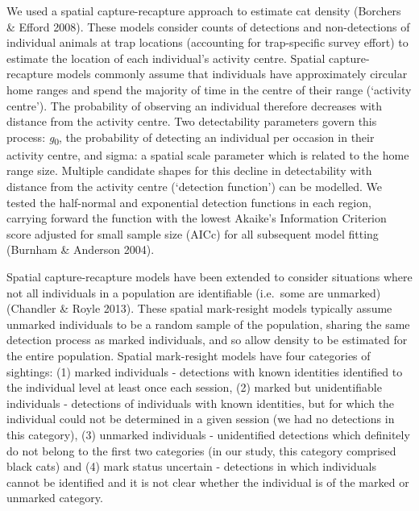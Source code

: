 \documentclass[]{elsarticle} %
\begin{document}
We used a spatial capture-recapture approach to estimate cat density (Borchers \& Efford 2008). These models consider counts of detections and non-detections of individual animals at trap locations (accounting for trap-specific survey effort) to estimate the location of each individual's activity centre. Spatial capture-recapture models commonly assume that individuals have approximately circular home ranges and spend the majority of time in the centre of their range (`activity centre'). The probability of observing an individual therefore decreases with distance from the activity centre. Two detectability parameters govern this process: \emph{g}\textsubscript{0}, the probability of detecting an individual per occasion in their activity centre, and sigma: a spatial scale parameter which is related to the home range size. Multiple candidate shapes for this decline in detectability with distance from the activity centre (`detection function') can be modelled. We tested the half-normal and exponential detection functions in each region, carrying forward the function with the lowest Akaike's Information Criterion score adjusted for small sample size (AICc) for all subsequent model fitting (Burnham \& Anderson 2004).

Spatial capture-recapture models have been extended to consider situations where not all individuals in a population are identifiable (i.e.~some are unmarked) (Chandler \& Royle 2013). These spatial mark-resight models typically assume unmarked individuals to be a random sample of the population, sharing the same detection process as marked individuals, and so allow density to be estimated for the entire population. Spatial mark-resight models have four categories of sightings: (1) marked individuals - detections with known identities identified to the individual level at least once each session, (2) marked but unidentifiable individuals - detections of individuals with known identities, but for which the individual could not be determined in a given session (we had no detections in this category), (3) unmarked individuals - unidentified detections which definitely do not belong to the first two categories (in our study, this category comprised black cats) and (4) mark status uncertain - detections in which individuals cannot be identified and it is not clear whether the individual is of the marked or unmarked category.
\end{document}
